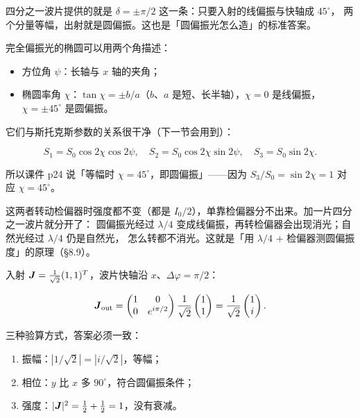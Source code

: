 \documentclass[11pt]{ctexart}
\let\subhdrtheme\subhdr
\renewcommand{\subhdr}[1]{\needspace{4\baselineskip}\subhdrtheme{#1}}
\begin{document}
四分之一波片提供的就是 $\delta=\pm\pi/2$ 这一条：只要入射的线偏振与快轴成 $45^\circ$，
两个分量等幅，出射就是圆偏振。这也是「圆偏振光怎么造」的标准答案。


完全偏振光的椭圆可以用两个角描述：

\begin{itemize}[leftmargin=1.6em]
\item 方位角 $\psi$：长轴与 $x$ 轴的夹角；
\item 椭圆率角 $\chi$：$\tan\chi=\pm b/a$（$b$、$a$ 是短、长半轴），$\chi=0$ 是线偏振，
$\chi=\pm45^\circ$ 是圆偏振。
\end{itemize}

它们与斯托克斯参数的关系很干净（下一节会用到）：

\[
S_1=S_0\cos2\chi\cos2\psi,\quad
S_2=S_0\cos2\chi\sin2\psi,\quad
S_3=S_0\sin2\chi .
\]

所以课件 p24 说「等幅时 $\chi=45^\circ$，即圆偏振」——因为 $S_3/S_0=\sin2\chi=1$ 对应 $\chi=45^\circ$。


这两者转动检偏器时强度都不变（都是 $I_0/2$），单靠检偏器分不出来。加一片四分之一波片就分开了：
圆偏振光经过 $\lambda/4$ 变成线偏振，再转检偏器会出现消光；自然光经过 $\lambda/4$ 仍是自然光，
怎么转都不消光。这就是「用 $\lambda/4$ + 检偏器测圆偏振度」的原理（§8.9）。


入射 $\boldsymbol{J}=\frac{1}{\sqrt2}(1,1)^{T}$，波片快轴沿 $x$、$\Delta\varphi=\pi/2$：

\[
\boldsymbol{J}_{\text{out}}=\begin{pmatrix}1&0\\0&e^{i\pi/2}\end{pmatrix}
\frac{1}{\sqrt2}\begin{pmatrix}1\\1\end{pmatrix}
=\frac{1}{\sqrt2}\begin{pmatrix}1\\ i\end{pmatrix}.
\]

三种验算方式，答案必须一致：
\begin{enumerate}[label=(\arabic*),leftmargin=1.8em]
\item 振幅：$|1/\sqrt2|=|i/\sqrt2|$，等幅；
\item 相位：$y$ 比 $x$ 多 $90^\circ$，符合圆偏振条件；
\item 强度：$|\boldsymbol{J}|^2=\frac12+\frac12=1$，没有衰减。
\end{enumerate}
\end{document}
